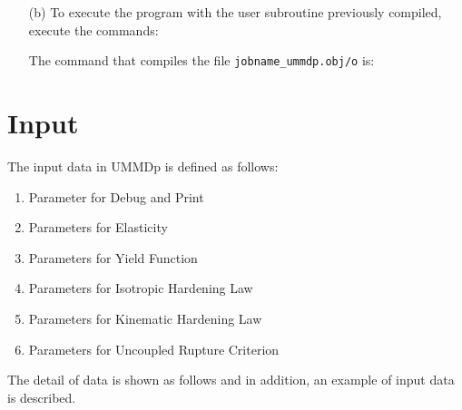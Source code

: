 \documentclass[11pt,a4paper,twoside,final,onecolumn,titlepage]{article}
\begin{document}
\begin{enumerate}
\item[(b)] To execute the program with the user subroutine previously compiled, execute the commands:\\
	\par
	\texttt{}
	\par\bigskip
	\par
	\texttt{}
	\par\bigskip
\item[] The command that compiles the file \texttt{jobname\_ummdp.obj/o} is:\\
	\par
	\texttt{}
	\par\bigskip
\end{enumerate}

\newpage
\section{Input}
\vspace{0.5cm}

The input data in UMMDp is defined as follows:

\begin{enumerate}
	\item Parameter for Debug and Print
	\item Parameters for Elasticity
	\item Parameters for Yield Function
	\item Parameters for Isotropic Hardening Law
	\item Parameters for Kinematic Hardening Law
	\item Parameters for Uncoupled Rupture Criterion
\end{enumerate}

\noindent The detail of data is shown as follows and in addition, an example of input data is described.

\vspace{0.2cm}
\end{document}
